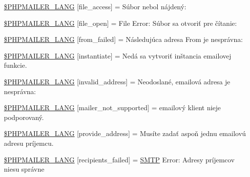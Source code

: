 \begin{DoxyCompactItemize}
\item 
\hyperlink{phpmailer_8lang-sk_8php_a7e83349023b856ef9e5c46e30ae6d51e}{\$\+P\+H\+P\+M\+A\+I\+L\+E\+R\+\_\+\+L\+A\+NG} \mbox{[}\textquotesingle{}file\+\_\+access\textquotesingle{}\mbox{]} = \textquotesingle{}Súbor nebol nájdený\+: \textquotesingle{}
\item 
\hyperlink{phpmailer_8lang-sk_8php_a28d1a6517bf4c942a0ddd506188ad2e0}{\$\+P\+H\+P\+M\+A\+I\+L\+E\+R\+\_\+\+L\+A\+NG} \mbox{[}\textquotesingle{}file\+\_\+open\textquotesingle{}\mbox{]} = \textquotesingle{}File Error\+: Súbor sa otvoriť pre čítanie\+: \textquotesingle{}
\item 
\hyperlink{phpmailer_8lang-sk_8php_adf832ae12155a09be077c6d5e4fd7e22}{\$\+P\+H\+P\+M\+A\+I\+L\+E\+R\+\_\+\+L\+A\+NG} \mbox{[}\textquotesingle{}from\+\_\+failed\textquotesingle{}\mbox{]} = \textquotesingle{}Následujúca adresa From je nesprávna\+: \textquotesingle{}
\item 
\hyperlink{phpmailer_8lang-sk_8php_ad58dde16780f4770ccf4dd282ea1f5ad}{\$\+P\+H\+P\+M\+A\+I\+L\+E\+R\+\_\+\+L\+A\+NG} \mbox{[}\textquotesingle{}instantiate\textquotesingle{}\mbox{]} = \textquotesingle{}Nedá sa vytvoriť inštancia emailovej funkcie.\textquotesingle{}
\item 
\hyperlink{phpmailer_8lang-sk_8php_a42d61bcea4c79599ecb44fd062f54d47}{\$\+P\+H\+P\+M\+A\+I\+L\+E\+R\+\_\+\+L\+A\+NG} \mbox{[}\textquotesingle{}invalid\+\_\+address\textquotesingle{}\mbox{]} = \textquotesingle{}Neodoslané, emailová adresa je nesprávna\+: \textquotesingle{}
\item 
\hyperlink{phpmailer_8lang-sk_8php_aa2ebcb8833ee83a7ad67401c4bb3a6ad}{\$\+P\+H\+P\+M\+A\+I\+L\+E\+R\+\_\+\+L\+A\+NG} \mbox{[}\textquotesingle{}mailer\+\_\+not\+\_\+supported\textquotesingle{}\mbox{]} = \textquotesingle{} emailový klient nieje podporovaný.\textquotesingle{}
\item 
\hyperlink{phpmailer_8lang-sk_8php_a8b97897c2406b7392b056f375feeefbb}{\$\+P\+H\+P\+M\+A\+I\+L\+E\+R\+\_\+\+L\+A\+NG} \mbox{[}\textquotesingle{}provide\+\_\+address\textquotesingle{}\mbox{]} = \textquotesingle{}Musíte zadať aspoň jednu emailovú adresu príjemcu.\textquotesingle{}
\item 
\hyperlink{phpmailer_8lang-sk_8php_a7589d30bb9b368327c2df015f3e6bcba}{\$\+P\+H\+P\+M\+A\+I\+L\+E\+R\+\_\+\+L\+A\+NG} \mbox{[}\textquotesingle{}recipients\+\_\+failed\textquotesingle{}\mbox{]} = \textquotesingle{}\hyperlink{class_s_m_t_p}{S\+M\+TP} Error\+: Adresy príjemcov niesu správne \textquotesingle{}
\item 

\end{DoxyCompactItemize}
